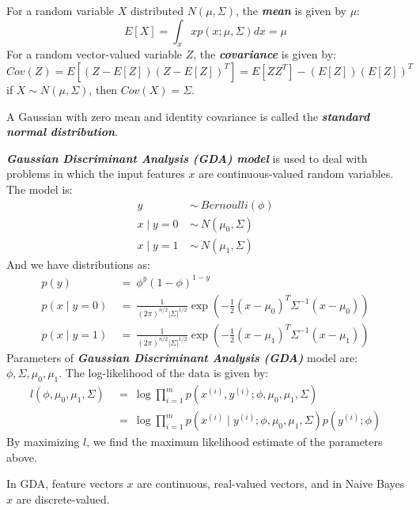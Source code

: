 \documentclass{article}
\begin{document}
For a random variable $X$ distributed $N(\mu, \Sigma)$, the \emph{\textbf{mean}} is given by $\mu$:
\begin{equation*}
E[X]=\int_x xp(x;\mu,\Sigma)dx=\mu
\end{equation*}
For a random vector-valued variable $Z$, the \emph{\textbf{covariance}} is given by:
\begin{equation*}
Cov(Z)=E[(Z-E[Z])(Z-E[Z])^T]=E[ZZ^T]-(E[Z])(E[Z])^T
\end{equation*}
if $X\sim N(\mu,\Sigma)$, then $Cov(X)=\Sigma$.

A Gaussian with zero mean and identity covariance is called the \emph{\textbf{standard normal distribution}}.

\emph{\textbf{Gaussian Discriminant Analysis (GDA) model}} is used to deal with problems in which the input features $x$ are continuous-valued random variables.
The model is:
\begin{align*}
y\ &\sim\ Bernoulli(\phi) \\
x\mid y=0\ &\sim\ N(\mu_0,\Sigma) \\
x\mid y=1\ &\sim\ N(\mu_1,\Sigma) 
\end{align*}
And we have distributions as:
\begin{align*}
p(y)\ &=\ \phi^y(1-\phi)^{1-y} \\
p(x\mid y=0)\ &=\ \frac{1}{(2\pi)^{n/2}\lvert\Sigma\rvert^{1/2}}\exp\left(-\frac{1}{2}(x-\mu_0)^T\Sigma^{-1}(x-\mu_0)\right) \\
p(x\mid y=1)\ &=\ \frac{1}{(2\pi)^{n/2}\lvert\Sigma\rvert^{1/2}}\exp\left(-\frac{1}{2}(x-\mu_1)^T\Sigma^{-1}(x-\mu_1)\right)
\end{align*}
Parameters of \emph{\textbf{Gaussian Discriminant Analysis (GDA)}} model are: $\phi, \Sigma, \mu_0, \mu_1$.
The log-likelihood of the data is given by:
\begin{align*}
l(\phi, \mu_0, \mu_1, \Sigma)\ &=\ \log\prod_{i=1}^mp(x^{(i)},y^{(i)};\phi,\mu_0,\mu_1,\Sigma) \\
                               &=\ \log\prod_{i=1}^mp(x^{(i)}\mid y^{(i)};\phi,\mu_0,\mu_1,\Sigma)p(y^{(i)};\phi)
\end{align*}
By maximizing $l$, we find the maximum likelihood estimate of the parameters above.

\begin{spacing}{2}
\end{spacing}

In GDA, feature vectors $x$ are continuous, real-valued vectors, and in Naive Bayes $x$ are discrete-valued.
\end{document}
